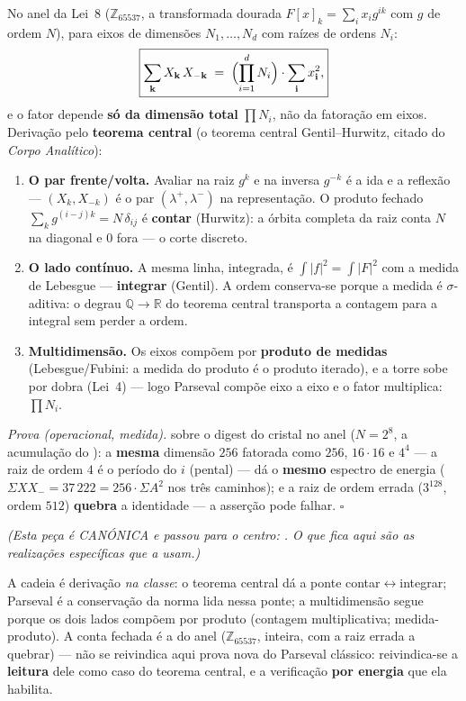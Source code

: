 \documentclass[livro.tex]{subfiles}
\begin{document}
\begin{teorema}\label{thm:parseval-multi}
No anel da Lei~8 ($\mathbb{Z}_{65537}$, a transformada dourada
$F[x]_k=\sum_i x_i g^{ik}$ com $g$ de ordem $N$), para eixos de
dimensões $N_1,\ldots,N_d$ com raízes de ordens $N_i$:
\[
\boxed{
\sum_{\mathbf{k}} X_{\mathbf{k}}\,X_{-\mathbf{k}}
\;=\;
\Bigl(\prod_{i=1}^{d} N_i\Bigr)\cdot\sum_{\mathbf{i}} x_{\mathbf{i}}^{2},
}
\]
e o fator depende \textbf{só da dimensão total} $\prod N_i$, não da
fatoração em eixos. Derivação pelo \textbf{teorema central}
(o teorema central Gentil--Hurwitz, citado do \emph{Corpo Analítico}):
\begin{enumerate}
\item \textbf{O par frente/volta.} Avaliar na raiz $g^{k}$ e na inversa
$g^{-k}$ é a ida e a reflexão --- $(X_k,X_{-k})$ é o par
$(\lambda^{+},\lambda^{-})$ na representação. O produto fechado
$\sum_k g^{(i-j)k}=N\,\delta_{ij}$ é \textbf{contar} (Hurwitz): a órbita
completa da raiz conta $N$ na diagonal e $0$ fora --- o corte discreto.
\item \textbf{O lado contínuo.} A mesma linha, integrada, é
$\int|f|^{2}=\int|F|^{2}$ com a medida de Lebesgue --- \textbf{integrar}
(Gentil). A ordem conserva-se porque a medida é $\sigma$-aditiva: o
degrau $\mathbb{Q}\to\mathbb{R}$ do teorema central transporta a
contagem para a integral sem perder a ordem.
\item \textbf{Multidimensão.} Os eixos compõem por \textbf{produto de
medidas} (Lebesgue/Fubini: a medida do produto é o produto iterado), e a
torre sobe por dobra (Lei~4) --- logo Parseval compõe eixo a eixo e o
fator multiplica: $\prod N_i$.
\end{enumerate}
\emph{Prova (operacional, medida).} 
sobre o digest do cristal no anel ($N=2^{8}$, a acumulação do
): a \textbf{mesma} dimensão $256$ fatorada como
$256$, $16\cdot16$ e $4^{4}$ --- a raiz de ordem $4$ é o período do $i$
(pental) --- dá o \textbf{mesmo} espectro de energia
($\Sigma X X_{-}=37\,222=256\cdot\Sigma A^{2}$ nos três caminhos); e a
raiz de ordem errada ($3^{128}$, ordem $512$) \textbf{quebra} a
identidade --- a asserção pode falhar. $\square$
\end{teorema}

\noindent\emph{(Esta peça é CANÓNICA e passou para o centro: . O que fica aqui são as realizações específicas que a usam.)}


\begin{observacao}[estatuto]
A cadeia é derivação \emph{na classe}: o teorema central dá a ponte
contar$\leftrightarrow$integrar; Parseval é a conservação da norma lida
nessa ponte; a multidimensão segue porque os dois lados compõem por
produto (contagem multiplicativa; medida-produto). A conta fechada é a
do anel ($\mathbb{Z}_{65537}$, inteira, com a raiz errada a quebrar) ---
não se reivindica aqui prova nova do Parseval clássico: reivindica-se a
\textbf{leitura} dele como caso do teorema central, e a verificação
\textbf{por energia} que ela habilita.
\end{observacao}
\end{document}
